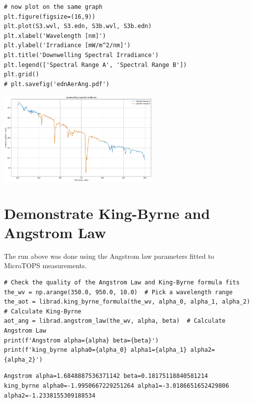\begin{lstlisting}[style=tinysize]
# now plot on the same graph
plt.figure(figsize=(16,9))
plt.plot(S3.wvl, S3.edn, S3b.wvl, S3b.edn)
plt.xlabel('Wavelength [nm]')
plt.ylabel('Irradiance [mW/m^2/nm]')
plt.title('Downwelling Spectral Irradiance')
plt.legend(['Spectral Range A', 'Spectral Range B'])
plt.grid()
# plt.savefig('ednAerAng.pdf')
\end{lstlisting}

\begin{center}
\includegraphics[width=0.6\textwidth]{./pic/libraddaskTemplate_14_0.png}
\end{center}


\section{Demonstrate King-Byrne and Angstrom Law}
\label{sec:DemonstrateKingByrneandAngstromLaw}

The run above was done using the Angstrom law parameters fitted to MicroTOPS measurements.




\begin{lstlisting}[style=tinysize]
# Check the quality of the Angstrom Law and King-Byrne formula fits
the_wv = np.arange(350.0, 950.0, 10.0)  # Pick a wavelength range
the_aot = librad.king_byrne_formula(the_wv, alpha_0, alpha_1, alpha_2)  # Calculate King-Byrne 
aot_ang = librad.angstrom_law(the_wv, alpha, beta)  # Calculate Angstrom Law
print(f'Angstrom alpha={alpha} beta={beta}')
print(f'king_byrne alpha0={alpha_0} alpha1={alpha_1} alpha2={alpha_2}')

\end{lstlisting}


\begin{lstlisting}[style=outcellstyle]
Angstrom alpha=1.6848887536371142 beta=0.18175118840581214
king_byrne alpha0=-1.9950667229251264 alpha1=-3.0186651652429806 alpha2=-1.2338155309188534

\end{lstlisting}


